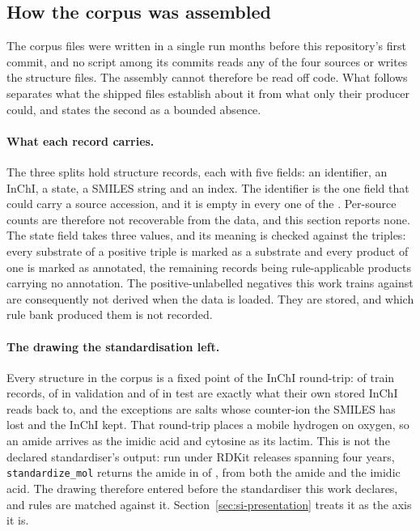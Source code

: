 \documentclass[journal=jcisd8,manuscript=suppinfo,layout=onecolumn]{achemso}
\begin{document}
\subsection{How the corpus was assembled}

The corpus files were written in a single run months before this repository's first commit, and
no script among its \numAssemblyCommits{} commits reads any of the four sources or writes the
structure files. The assembly cannot therefore be read off code. What follows separates what the
shipped files establish about it from what only their producer could, and states the second as a
bounded absence.

\paragraph{What each record carries.} The three splits hold \numAssemblyRecords{} structure
records, each with five fields: an identifier, an InChI, a state, a SMILES string and an index.
The identifier is the one field that could carry a source accession, and it is empty in every
one of the \numAssemblyRecords{}. Per-source counts are therefore not
recoverable from the data, and this section reports none. The state field takes three values, and
its
meaning is checked against the triples: every substrate of a positive triple
is marked as a substrate and every product of one is marked as annotated, the remaining records
being rule-applicable products carrying no annotation. The positive-unlabelled negatives this
work trains against are consequently not derived when the data is loaded. They are stored, and
which rule bank produced them is not recorded.

\paragraph{The drawing the standardisation left.} Every structure in the corpus is a fixed point
of the InChI round-trip: \numDialectTrainRtequal{} of \numDialectTrainRtof{} train records,
\numDialectValRtequal{} of \numDialectValRtof{} in validation and \numDialectTestRtequal{} of
\numDialectTestRtof{} in test are exactly what their own stored InChI reads back to, and the
\numDialectTrainRtdifferWord{} exceptions are salts whose counter-ion the SMILES has lost and the
InChI kept. That round-trip places a mobile hydrogen on oxygen, so an amide arrives as the imidic
acid and cytosine as its lactim. This is not the declared standardiser's output: run under
\numDialectRdkitversionsWord{} RDKit releases spanning four years, \texttt{standardize\_mol} returns
the amide in \numDialectRdkitamideWord{} of \numDialectRdkitversionsWord{}, from both the amide and
the
imidic acid. The drawing therefore entered before the standardiser this work declares, and rules
are matched against it. Section~\ref{sec:si-presentation} treats it as the axis it is.
\end{document}
